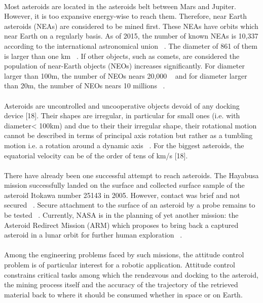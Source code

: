 \paragraph{}	Most asteroids are located in the asteroids belt between Mars and Jupiter. However, it is too expansive energy-wise to reach them. Therefore, near Earth asteroids (NEAs) are considered to be mined first. These NEAs have orbits which near Earth on a regularly basis. As of 2015, the number of known NEAs is 10,337 according to the international astronomical union ~\cite{Sommariva2015}. The diameter of 861 of them is larger than one km ~\cite{Sommariva2015}. If other objects, such as comets, are considered the population of near-Earth objects (NEOs) increases significantly. For diameter larger than 100m, the number of NEOs nears 20,000 ~\cite{Mainzer2011} and for diameter larger than 20m, the number of NEOs nears 10 millions ~\cite{Mainzer2011}.
\paragraph{}	Asteroids are uncontrolled and uncooperative objects devoid of any docking device [18]. Their shapes are irregular, in particular for small ones (i.e. with diameter< 100km) and due to their their irregular shape, their rotational motion cannot be described in terms of principal axis rotation but rather as a tumbling motion i.e. a rotation around a dynamic axis ~\cite{Elvis2014,LewisBook}. For the biggest asteroids, the equatorial velocity can be of the order of tens of km/s [18]. 
\paragraph{}There have already been one successful attempt to reach asteroids. The Hayabusa mission successfully landed on the surface and collected surface sample of the asteroid Itokawa number 25143 in 2005. However, contact was brief and not secured ~\cite{LewisBook}. Secure attachment to the surface of an asteroid by a probe remains to be tested ~\cite{LewisBook}. Currently, NASA is in the planning of yet another mission: the Asteroid Redirect Mission (ARM) which proposes to bring back a captured asteroid in a lunar orbit for further human exploration ~\cite{Sommariva2015}. 
\paragraph{}Among the engineering problems faced by such missions, the attitude control problem is of particular interest for a robotic application. Attitude control constrains critical tasks among which the rendezvous and docking to the asteroid, the mining process itself and the accuracy of the trajectory of the retrieved material back to where it should be consumed whether in space or on Earth. 
